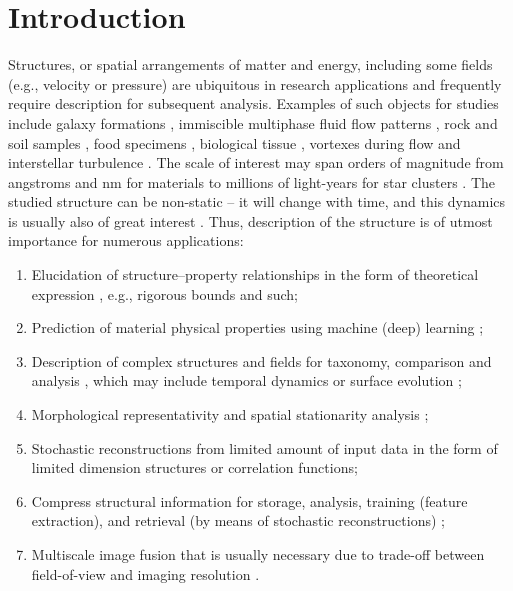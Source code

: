 \documentclass[reprint,amsmath,amssymb,aps,pre,showkeys,showpacs]{revtex4-1}
\begin{document}
\section{Introduction}
\label{sec:intro}
Structures, or spatial arrangements of matter and energy, including some fields
(e.g., velocity or pressure) are ubiquitous in research applications and
frequently require description for subsequent analysis. Examples of such objects
for studies include galaxy formations \cite{springel2006}, immiscible multiphase
fluid flow patterns \cite{hopkins2015new,balashov2021}, rock and soil samples
\cite{rozenbaum2014,karsanina2015,ledesma2018,chen2020super,prokhorov2021digital,vogel2010},
food specimens \cite{derossi2019,nagdalian2021}, biological tissue
\cite{park2020}, vortexes during flow \cite{gorbunova2016precessing} and
interstellar turbulence \cite{portillo2018developing}. The scale of interest may
span orders of magnitude from angstroms and nm for materials
\cite{garum2020,gerke2021,khlyupin2023molecular} to millions of light-years for
star clusters \cite{takada2003three,hopkins2013stars}. The studied structure can
be non-static -- it will change with time, and this dynamics is usually also of
great interest \cite{jiao2013,fomin2023soil}. Thus, description of the structure
is of utmost importance for numerous applications:
\begin{enumerate}
  \item Elucidation of structure--property relationships in the form of
    theoretical expression \cite{Torquato_book,Sahimi_book}, e.g., rigorous
    bounds and such;
  \item Prediction of material physical properties using machine (deep) learning
    \cite{obayashi2018persistence,kamrava2020linking,roding2020predicting};
  \item Description of complex structures and fields for taxonomy, comparison
    and analysis
    \cite{takada2003three,hopkins2013stars,shivashankar2015felix,saadatfar2017pore,
      portillo2018developing,cheng2022data,KarsaninaEJSS,PNM_Morse,khlyupin2023molecular},
    which may include temporal dynamics or surface evolution
    \cite{jiao2013,PhysRevE.92.023301,prokhorov2022,chen2022,fomin2023soil};
  \item Morphological representativity
    \cite{capek2009,rozenbaum2014,gerke2019tensor,zubov2024search} and spatial stationarity
    analysis \cite{REVpaper,LavrukhinPRE,zubov2024search};
  \item Stochastic reconstructions from limited amount of input data
    \cite{Adler_recon,Y-T,tahmasebiPRL,Euras2012,EPL2,karsaninaPRL,rozanski2023}
    in the form of limited dimension structures or correlation functions;
  \item Compress structural information for storage, analysis, training (feature
    extraction), and retrieval (by means of stochastic reconstructions)
    \cite{jiao2007,SciRep1,Havelka,KarsaninaEJSS};
  \item Multiscale image fusion that is usually necessary due to trade-off
    between field-of-view and imaging resolution
    \cite{SciRep1,Geoderma2018,chen2020super,yan2023multiscale,karimpouli2022,yan2024modeling}.
\end{enumerate}
\end{document}
